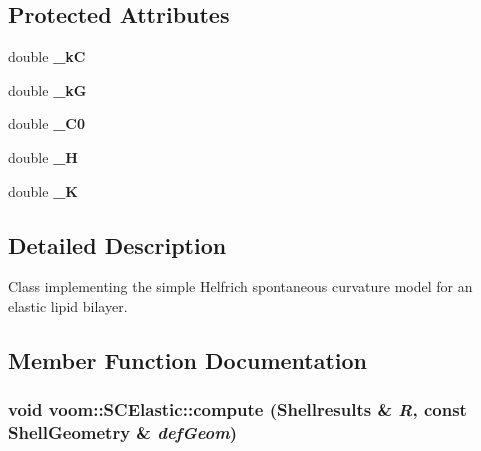 \subsection*{Protected Attributes}
\begin{DoxyCompactItemize}
\item 
\hypertarget{classvoom_1_1_s_c_elastic_ab15c9f9fd2e030c3c6c911a95113f795}{
double {\bfseries \_\-kC}}
\label{classvoom_1_1_s_c_elastic_ab15c9f9fd2e030c3c6c911a95113f795}

\item 
\hypertarget{classvoom_1_1_s_c_elastic_aa52a5d66c3d562b506e8e7b248bce9c4}{
double {\bfseries \_\-kG}}
\label{classvoom_1_1_s_c_elastic_aa52a5d66c3d562b506e8e7b248bce9c4}

\item 
\hypertarget{classvoom_1_1_s_c_elastic_a37cc05ae1cb6bb052b7d863950caf3d2}{
double {\bfseries \_\-C0}}
\label{classvoom_1_1_s_c_elastic_a37cc05ae1cb6bb052b7d863950caf3d2}

\item 
\hypertarget{classvoom_1_1_s_c_elastic_a12ec4b008b7080a376a590b7479d37c8}{
double {\bfseries \_\-H}}
\label{classvoom_1_1_s_c_elastic_a12ec4b008b7080a376a590b7479d37c8}

\item 
\hypertarget{classvoom_1_1_s_c_elastic_a688c8421fa666ca504c0c3273b25cd68}{
double {\bfseries \_\-K}}
\label{classvoom_1_1_s_c_elastic_a688c8421fa666ca504c0c3273b25cd68}

\end{DoxyCompactItemize}


\subsection{Detailed Description}
Class implementing the simple Helfrich spontaneous curvature model for an elastic lipid bilayer. 

\subsection{Member Function Documentation}
\hypertarget{classvoom_1_1_s_c_elastic_ab492944d398efffa67fa3763a1cbd7fc}{
\subsubsection[{compute}]{\setlength{\rightskip}{0pt plus 5cm}void voom::SCElastic::compute ({\bf Shellresults} \& {\em R}, \/  const {\bf ShellGeometry} \& {\em defGeom})}}
\label{classvoom_1_1_s_c_elastic_ab492944d398efffa67fa3763a1cbd7fc}


